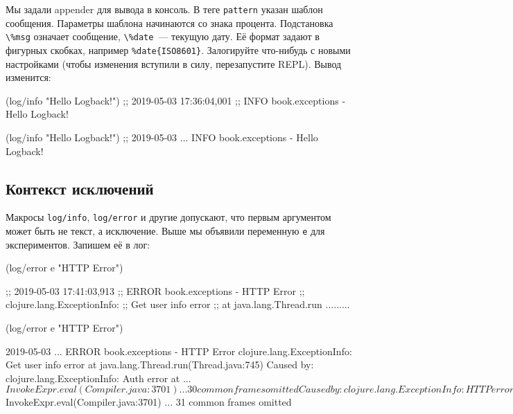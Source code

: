 \fi


Мы задали appender для вывода в консоль. В теге \verb|pattern| указан шаблон
сообщения. Параметры шаблона начинаются со знака процента. Подстановка
\verb|\%msg| означает сообщение, \verb|\%date|~--- текущую дату. Её формат
задают в фигурных скобках, например \verb|%date{ISO8601}|. Залогируйте
что-нибудь с новыми настройками (чтобы изменения вступили в силу, перезапустите
REPL). Вывод изменится:

\ifnarrow

\begin{english}
  \begin{clojure}
(log/info "Hello Logback!")
;; 2019-05-03 17:36:04,001
;; INFO book.exceptions - Hello Logback!
  \end{clojure}
\end{english}

\else

\begin{english}
  \begin{clojure}
(log/info "Hello Logback!")
;; 2019-05-03 ... INFO book.exceptions - Hello Logback!
  \end{clojure}
\end{english}

\fi

\label{log-ex-param}

\subsection{Контекст исключений}

Макросы \verb|log/info|, \verb|log/error| и другие допускают, что первым
аргументом может быть не текст, а исключение. Выше мы объявили переменную
\verb|e| для экспериментов. Запишем её в лог:

\ifnarrow

\begin{english}
  \begin{clojure}
(log/error e "HTTP Error")

;; 2019-05-03 17:41:03,913
;; ERROR book.exceptions - HTTP Error
;; clojure.lang.ExceptionInfo:
;; Get user info error
;; at java.lang.Thread.run .........
  \end{clojure}
\end{english}

\else

\begin{english}
  \begin{clojure}
(log/error e "HTTP Error")

2019-05-03 ... ERROR book.exceptions - HTTP Error
clojure.lang.ExceptionInfo: Get user info error
    at java.lang.Thread.run(Thread.java:745)
Caused by: clojure.lang.ExceptionInfo: Auth error
    at ...$InvokeExpr.eval(Compiler.java:3701)
    ... 30 common frames omitted
Caused by: clojure.lang.ExceptionInfo: HTTP error
    at ...$InvokeExpr.eval(Compiler.java:3701)
    ... 31 common frames omitted
  \end{clojure}
\end{english}

